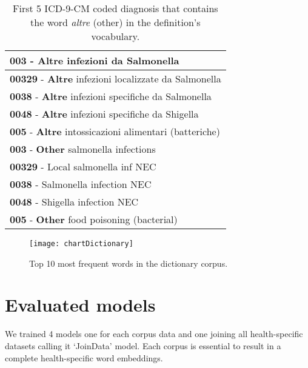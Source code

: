 \begin{table}[h!]
	\begin{center}  
		\caption[First 5 ICD-9-CM coded diagnosis that contains the word \textit{altre} (other)]{First 5 ICD-9-CM coded diagnosis that contains the word \textit{altre} (other) in the definition's vocabulary.} 
		\label{tab:tableICd9CMaltre}
		\begin{tabular}{|p{\linewidth}|} 
			\hline
			\textbf{003} - \textbf{Altre} infezioni da Salmonella	\\ \hline
			\textbf{00329} - \textbf{Altre} infezioni localizzate da Salmonella	\\ \hline
			\textbf{0038} - \textbf{Altre} infezioni specifiche da Salmonella	\\ \hline
			\textbf{0048} - \textbf{Altre} infezioni specifiche da Shigella	\\ \hline
			\textbf{005} - \textbf{Altre} intossicazioni alimentari (batteriche)	\\ \hline \hline
			\textbf{003} - \textbf{Other} salmonella infections	\\ \hline
			\textbf{00329} - Local salmonella inf NEC	\\ \hline
			\textbf{0038} - Salmonella infection NEC	\\ \hline
			\textbf{0048} - Shigella infection NEC \\ \hline
			\textbf{005} - \textbf{Other} food poisoning (bacterial)	\\ \hline
		\end{tabular} 
	\end{center}
\end{table}

\begin{figure}[ht]
	\centering
	\texttt{[image: chartDictionary]}
	\caption[Top 10 most frequent words in ICD-9-CM Dictionary]{Top 10 most frequent words in the dictionary corpus.}
	\label{fig:chartDictionary}
\end{figure}

\section{Evaluated models}
We trained 4 models one for each corpus data and one joining all health-specific datasets calling it \enquote*{JoinData} model. Each corpus is essential to result in a complete health-specific word embeddings. 
